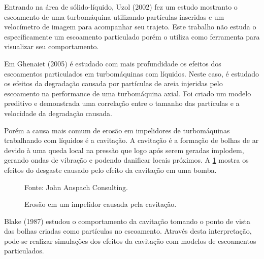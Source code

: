 Entrando na área de sólido-líquido, Uzol (2002)\cite{Uzol-2002} fez um estudo mostranto o escoamento de uma turbomáquina utilizando partículas inseridas e um velocímetro de imagem para acompanhar seu trajeto.
Este trabalho não estuda o específicamente um escoamento particulado porém o utiliza como ferramenta para visualizar seu comportamento.

Em Ghenaiet (2005)\cite{Ghenaiet-2005} é estudado com mais profundidade os efeitos dos escoamentos particulados em turbomáquinas com líquidos.
Neste caso, é estudado os efeitos da degradação causada por partículas de areia injeridas pelo escoamento na performance de uma turbomáquina axial.
Foi criado um modelo preditivo e demonstrada uma correlação entre o tamanho das partículas e a velocidade da degradação causada.

Porém a causa mais comum de erosão em impelidores de turbomáquinas trabalhando com líquidos é a cavitação.
A cavitação é a formação de bolhas de ar devido à uma queda local na pressão que logo após serem geradas implodem, gerando ondas de vibração e podendo danificar locais próximos.
A \ref{JAC-Pump} mostra os efeitos do desgaste causado pelo efeito da cavitação em uma bomba.
\begin{figure}[H]
    \centering
     {\raggedleft \scriptsize Fonte: John Anspach Consulting\cite{JAC}.}
    \caption{Erosão em um impelidor causada pela cavitação.}
    \label{JAC-Pump}
\end{figure}

Blake (1987)\cite{Blake-1987} estudou o comportamento da cavitação tomando o ponto de vista das bolhas criadas como partículas no escoamento.
Através desta interpretação, pode-se realizar simulações dos efeitos da cavitação com modelos de escoamentos particulados.